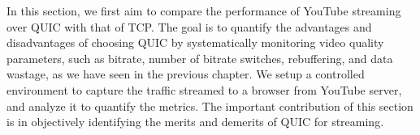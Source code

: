 

In this section, we first aim to compare the performance of YouTube streaming over \ac{QUIC} with that of \ac{TCP}. 
The goal is to quantify the advantages and disadvantages of choosing \ac{QUIC} by systematically monitoring video quality parameters, such as bitrate, number of bitrate switches, rebuffering, and data wastage, as we have seen in the previous chapter. We setup a controlled environment to capture the traffic streamed to a browser from YouTube server, and analyze it to quantify the metrics. The important contribution of this section is in objectively identifying the merits and demerits of \ac{QUIC} for streaming. 


